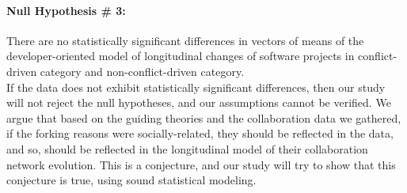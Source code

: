 \documentclass[12pt]{report}
\begin{document}
\paragraph*{Null Hypothesis \# 3:} 
\hspace{10 mm} There are no statistically significant differences in vectors of means of the developer-oriented model of longitudinal changes of software projects in conflict-driven category and non-conflict-driven category.\\

If the data does not exhibit statistically significant differences, then our study will not reject the null hypotheses, and our assumptions cannot be verified. We argue that based on the guiding theories and the collaboration data we gathered, if the forking reasons were socially-related, they should be reflected in the data, and so, should be reflected in the longitudinal model of their collaboration network evolution. This is a conjecture, and our study will try to show that this conjecture is true, using sound statistical modeling.

%
%
%
\end{document}
